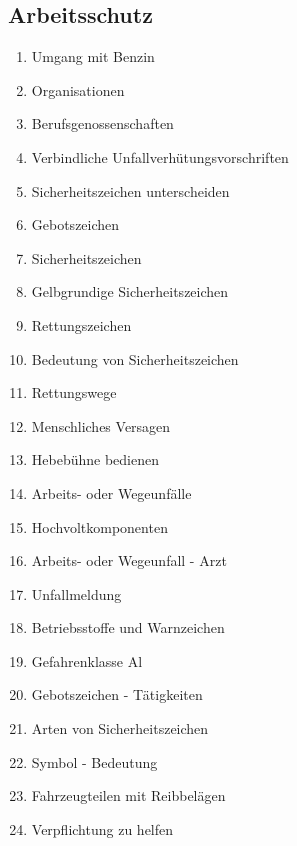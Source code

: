 \subsection{Arbeitsschutz}\label{arbeitsschutz}

\begin{enumerate}
\item
  Umgang mit Benzin\\
\item
  Organisationen\\
\item
  Berufsgenossenschaften\\
\item
  Verbindliche Unfallverhütungsvorschriften\\
\item
  Sicherheitszeichen unterscheiden\\
\item
  Gebotszeichen\\
\item
  Sicherheitszeichen\\
\item
  Gelbgrundige Sicherheitszeichen\\
\item
  Rettungszeichen\\
\item
  Bedeutung von Sicherheitszeichen\\
\item
  Rettungswege\\
\item
  Menschliches Versagen\\
\item
  Hebebühne bedienen\\
\item
  Arbeits- oder Wegeunfälle\\
\item
  Hochvoltkomponenten\\
\item
  Arbeits- oder Wegeunfall - Arzt\\
\item
  Unfallmeldung\\
\item
  Betriebsstoffe und Warnzeichen\\
\item
  Gefahrenklasse Al\\
\item
  Gebotszeichen - Tätigkeiten\\
\item
  Arten von Sicherheitszeichen\\
\item
  Symbol - Bedeutung\\
\item
  Fahrzeugteilen mit Reibbelägen\\
\item
  Verpflichtung zu helfen
\end{enumerate}

